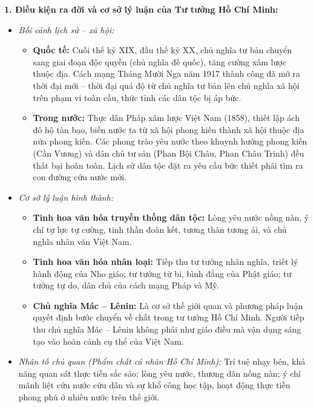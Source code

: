 \documentclass[12pt,a4paper]{article}
\begin{document}
\noindent
\textbf{1. Điều kiện ra đời và cơ sở lý luận của Tư tưởng Hồ Chí Minh:}
\begin{itemize}
    \item \textit{Bối cảnh lịch sử -- xã hội:}
    \begin{itemize}
        \item \textbf{Quốc tế:} Cuối thế kỷ XIX, đầu thế kỷ XX, chủ nghĩa tư bản chuyển sang giai đoạn độc quyền (chủ nghĩa đế quốc), tăng cường xâm lược thuộc địa. Cách mạng Tháng Mười Nga năm 1917 thành công đã mở ra thời đại mới -- thời đại quá độ từ chủ nghĩa tư bản lên chủ nghĩa xã hội trên phạm vi toàn cầu, thức tỉnh các dân tộc bị áp bức.
        \item \textbf{Trong nước:} Thực dân Pháp xâm lược Việt Nam (1858), thiết lập ách đô hộ tàn bạo, biến nước ta từ xã hội phong kiến thành xã hội thuộc địa nửa phong kiến. Các phong trào yêu nước theo khuynh hướng phong kiến (Cần Vương) và dân chủ tư sản (Phan Bội Châu, Phan Châu Trinh) đều thất bại hoàn toàn. Lịch sử dân tộc đặt ra yêu cầu bức thiết phải tìm ra con đường cứu nước mới.
    \end{itemize}
    \item \textit{Cơ sở lý luận hình thành:}
    \begin{itemize}
        \item \textbf{Tinh hoa văn hóa truyền thống dân tộc:} Lòng yêu nước nồng nàn, ý chí tự lực tự cường, tinh thần đoàn kết, tương thân tương ái, và chủ nghĩa nhân văn Việt Nam.
        \item \textbf{Tinh hoa văn hóa nhân loại:} Tiếp thu tư tưởng nhân nghĩa, triết lý hành động của Nho giáo; tư tưởng từ bi, bình đẳng của Phật giáo; tư tưởng tự do, dân chủ của cách mạng Pháp và Mỹ.
        \item \textbf{Chủ nghĩa Mác -- Lênin:} Là cơ sở thế giới quan và phương pháp luận quyết định bước chuyển về chất trong tư tưởng Hồ Chí Minh. Người tiếp thu chủ nghĩa Mác -- Lênin không phải như giáo điều mà vận dụng sáng tạo vào hoàn cảnh cụ thể của Việt Nam.
    \end{itemize}
    \item \textit{Nhân tố chủ quan (Phẩm chất cá nhân Hồ Chí Minh):} Trí tuệ nhạy bén, khả năng quan sát thực tiễn sắc sảo; lòng yêu nước, thương dân nồng nàn; ý chí mãnh liệt cứu nước cứu dân và sự khổ công học tập, hoạt động thực tiễn phong phú ở nhiều nước trên thế giới.
\end{itemize}
\end{document}
